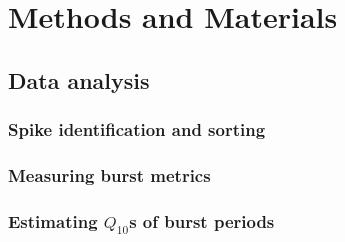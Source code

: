 \documentclass[9pt,lineno]{elife}
\begin{document}
\section{Methods and Materials}

\subsection*{Data analysis}

\subsubsection*{Spike identification and sorting}

\subsubsection*{Measuring burst metrics}

\subsubsection*{Estimating $Q_{10}$s of burst periods}




\appendix
\end{document}
